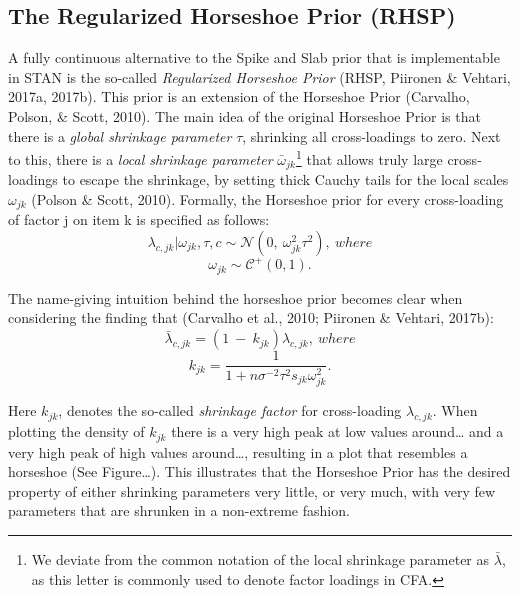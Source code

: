 \documentclass[
  man, donotrepeattitle,floatsintext]{apa6}
\begin{document}
\hypertarget{the-regularized-horseshoe-prior-rhsp}{%
\subsection{The Regularized Horseshoe Prior (RHSP)}\label{the-regularized-horseshoe-prior-rhsp}}

A fully continuous alternative to the Spike and Slab prior that is implementable in STAN is the so-called \emph{Regularized Horseshoe Prior} (RHSP, Piironen \& Vehtari, 2017a, 2017b). This prior is an extension of the Horseshoe Prior (Carvalho, Polson, \& Scott, 2010). The main idea of the original Horseshoe Prior is that there is a \emph{global shrinkage parameter} \(\tau\), shrinking all cross-loadings to zero. Next to this, there is a \emph{local shrinkage parameter} \(\bar{\omega}_{jk}\)\footnote{We deviate from the common notation of the local shrinkage parameter as \(\bar{\lambda}\), as this letter is commonly used to denote factor loadings in CFA.} that allows truly large cross-loadings to escape the shrinkage, by setting thick Cauchy tails for the local scales \(\omega_{jk}\) (Polson \& Scott, 2010). Formally, the Horseshoe prior for every cross-loading of factor j on item k is specified as follows:
\[\lambda_{c,jk} | \omega_{jk}, \tau, c\sim \mathcal{N}(0, \ \omega^2_{jk} \tau^2), \ where\]
\[\omega_{jk} \sim \mathcal{C^+}(0, 1).\]

The name-giving intuition behind the horseshoe prior becomes clear when considering the finding that (Carvalho et al., 2010; Piironen \& Vehtari, 2017b):
\[\bar{\lambda}_{c,jk} = (1 \ - \ k_{jk}) \hat{\lambda}_{c,jk}, \ where\]
\[k_{jk} = \frac{1}{1 + n \sigma^{-2}\tau^2s_{jk}\omega^2_{jk}}.\]

Here \(k_{jk}\), denotes the so-called \emph{shrinkage factor} for cross-loading \(\lambda_{c,jk}\).
When plotting the density of \(k_{jk}\) there is a very high peak at low values around\ldots{} and a very high peak of high values around\ldots, resulting in a plot that resembles a horseshoe (See Figure\ldots). This illustrates that the Horseshoe Prior has the desired property of either shrinking parameters very little, or very much, with very few parameters that are shrunken in a non-extreme fashion.
\end{document}
